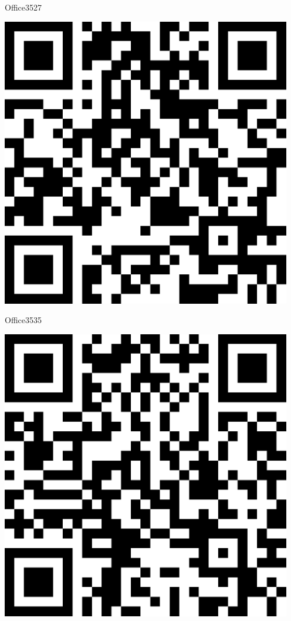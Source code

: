 \documentclass[letterpaper]{article}
\begin{document}
 \hfill{\small Office3527} 

 \vspace{1in} 
 \pagebreak 
{} 
 \vspace*{\fill} 
 \begingroup 
 \centerline{\includegraphics[scale=1,width=5in,height=5in]{Office3535.png}} 
 \endgroup 
 \vspace*{\fill} 

 \hfill{\small Office3535} 

 \vspace{1in} 
 \pagebreak 
{} 
 \vspace*{\fill} 
 \begingroup 
 \centerline{\includegraphics[scale=1,width=5in,height=5in]{Office3537.png}} 
 \endgroup 
 \vspace*{\fill} 
\end{document}
